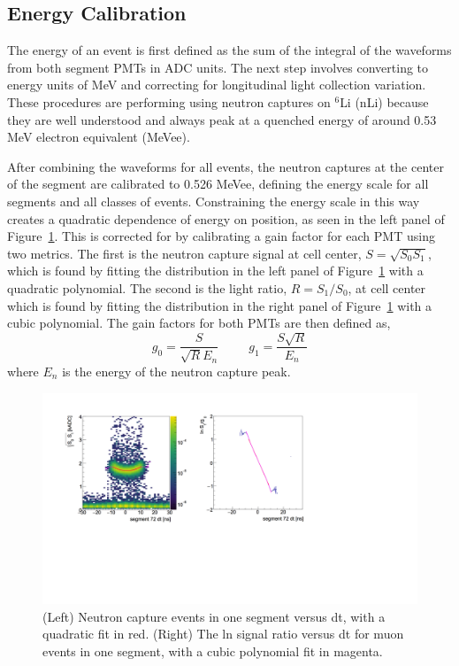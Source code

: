 \subsection{Energy Calibration}

The energy of an event is first defined as the sum of the integral of the waveforms from both segment PMTs in ADC units. 
The next step involves converting to energy units of MeV and correcting for longitudinal light collection variation.
These procedures are performing using neutron captures on $^6$Li (nLi) because they are well understood and always peak at a quenched energy of around 0.53 MeV electron equivalent (MeVee). 

After combining the waveforms for all events, the neutron captures at the center of the segment are calibrated to 0.526 MeVee, defining the energy scale for all segments and all classes of events. 
Constraining the energy scale in this way creates a quadratic dependence of energy on position, as seen in the left panel of Figure~\ref{fig:ecorrection}.
This is corrected for by calibrating a gain factor for each PMT using two metrics. 
The first is the neutron capture signal at cell center, $S = \sqrt{S_0S_1}$, which is found by fitting the distribution in the left panel of Figure~\ref{fig:ecorrection} with a quadratic polynomial.
The second is the light ratio, $R = S_1/S_0$, at cell center which is found by fitting the distribution in the right panel of Figure~\ref{fig:ecorrection} with a cubic polynomial.
The gain factors for both PMTs are then defined as, 
\begin{equation}
	g_0 = \frac{S}{\sqrt{R}E_n} ~~~~~~~~~~~ g_1 = \frac{S\sqrt{R}}{E_n}
\end{equation}
where $E_n$ is the energy of the neutron capture peak. 


\begin{figure}[t]
	\centering
	\includegraphics[width=0.9\linewidth]{tex/5-analysis-images/ECorrection}
	\caption[Energy position dependence]{(Left) Neutron capture events in one segment versus dt, with a quadratic fit in red. (Right) The ln signal ratio versus dt for muon events in one segment, with a cubic polynomial fit in magenta.}
	\label{fig:ecorrection}
\end{figure}



